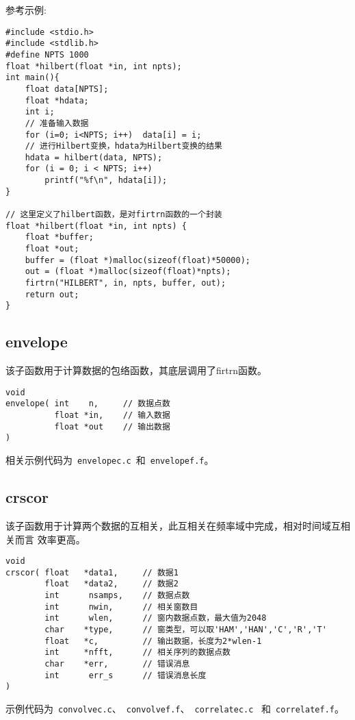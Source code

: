 参考示例:
\begin{verbatim}
#include <stdio.h>
#include <stdlib.h>
#define NPTS 1000
float *hilbert(float *in, int npts);
int main(){
    float data[NPTS];
    float *hdata;
    int i;
    // 准备输入数据
    for (i=0; i<NPTS; i++)  data[i] = i;
    // 进行Hilbert变换，hdata为Hilbert变换的结果
    hdata = hilbert(data, NPTS);
    for (i = 0; i < NPTS; i++)
        printf("%f\n", hdata[i]);
}

// 这里定义了hilbert函数，是对firtrn函数的一个封装
float *hilbert(float *in, int npts) {
    float *buffer;
    float *out;
    buffer = (float *)malloc(sizeof(float)*50000);
    out = (float *)malloc(sizeof(float)*npts);
    firtrn("HILBERT", in, npts, buffer, out);
    return out;
}
\end{verbatim}

\subsection{envelope}
该子函数用于计算数据的包络函数，其底层调用了firtrn函数。
\begin{verbatim}
void
envelope( int    n,     // 数据点数
          float *in,    // 输入数据
          float *out    // 输出数据
)
\end{verbatim}

相关示例代码为~\verb+envelopec.c+~和~\verb+envelopef.f+。

\subsection{crscor}
该子函数用于计算两个数据的互相关，此互相关在频率域中完成，相对时间域互相关而言
效率更高。

\begin{verbatim}
void
crscor( float   *data1,     // 数据1
        float   *data2,     // 数据2
        int      nsamps,    // 数据点数
        int      nwin,      // 相关窗数目
        int      wlen,      // 窗内数据点数，最大值为2048
        char    *type,      // 窗类型，可以取'HAM','HAN','C','R','T'
        float   *c,         // 输出数据，长度为2*wlen-1
        int     *nfft,      // 相关序列的数据点数
        char    *err,       // 错误消息
        int      err_s      // 错误消息长度
)
\end{verbatim}

示例代码为~\verb+convolvec.c+、~\verb+convolvef.f+、~\verb+correlatec.c+~
和~\verb+correlatef.f+。
